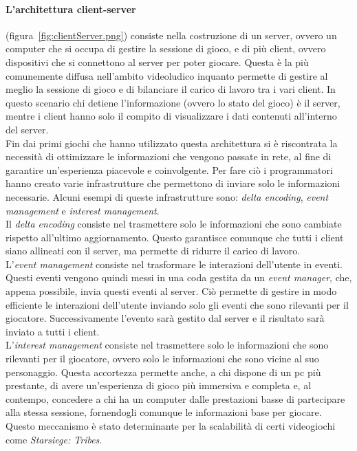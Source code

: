        \paragraph{L'architettura client-server} (figura~\ref{fig:clientServer.png}) consiste nella costruzione di un server, ovvero un computer che si occupa di gestire la sessione di 
            gioco, e di più client, ovvero dispositivi che si connettono al server per poter giocare. Questa è la più comunemente diffusa nell'ambito videoludico inquanto permette 
            di gestire al meglio la sessione di gioco e di bilanciare il carico di lavoro tra i vari client. In questo scenario chi detiene l'informazione (ovvero lo stato del gioco) 
            è il server, mentre i client hanno solo il compito di visualizzare i dati contenuti all'interno del server.\\ 
            Fin dai primi giochi che hanno utilizzato questa architettura
            si è riscontrata la necessità di ottimizzare le informazioni che vengono passate in rete, al fine di garantire un'esperienza piacevole e coinvolgente. Per fare ciò i 
            programmatori hanno creato varie infrastrutture che permettono di inviare solo le informazioni necessarie. Alcuni esempi di queste infrastrutture sono: 
            \textit{delta encoding}, \textit{event management} e \textit{interest management}.\\
            Il \textit{delta encoding} consiste nel trasmettere solo le informazioni che sono cambiate rispetto all'ultimo aggiornamento. Questo garantisce comunque che tutti
            i client siano allineati con il server, ma permette di ridurre il carico di lavoro.\\
            L'\textit{event management} consiste nel trasformare le interazioni dell'utente in eventi. Questi eventi vengono quindi messi in una coda gestita da un 
            \textit{event manager}, che, appena possibile, invia questi eventi al server. Ciò permette di gestire in modo efficiente le interazioni dell'utente inviando
            solo gli eventi che sono rilevanti per il giocatore. Successivamente l'evento sarà gestito dal server e il risultato sarà inviato a tutti i client.\\
            L'\textit{interest management} consiste nel trasmettere solo le informazioni che sono rilevanti per il giocatore, ovvero solo le informazioni che sono vicine al suo 
            personaggio. Questa accortezza permette anche, a chi dispone di un pc più prestante, di avere un'esperienza di gioco più immersiva e completa e, al contempo, concedere 
            a chi ha un computer dalle prestazioni basse di partecipare alla stessa sessione, fornendogli comunque le informazioni base per giocare. Questo meccanismo è stato
            determinante per la scalabilità di certi videogiochi come \textit{Starsiege: Tribes}.\\

